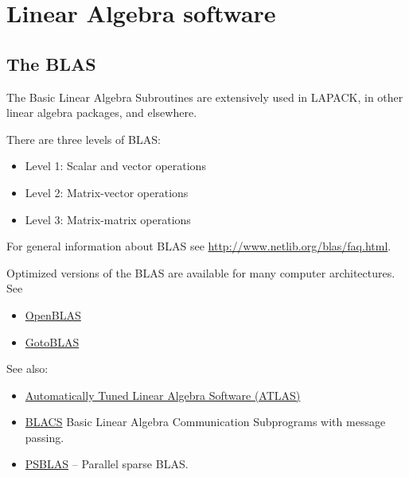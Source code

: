 \documentclass[letterpaper,10pt,english]{sphinxmanual}
\begin{document}
\section{Linear Algebra software}
\label{linalg:linear-algebra-software}\label{linalg::doc}\label{linalg:linalg}

\subsection{The BLAS}
\label{linalg:blas}\label{linalg:the-blas}
The Basic Linear Algebra Subroutines are extensively used in LAPACK, in
other linear algebra packages, and elsewhere.

There are three levels of BLAS:
\begin{itemize}
\item {} 
Level 1: Scalar and vector operations

\item {} 
Level 2: Matrix-vector operations

\item {} 
Level 3: Matrix-matrix operations

\end{itemize}

For general information about BLAS see
\url{http://www.netlib.org/blas/faq.html}.

Optimized versions of the BLAS are available for many computer
architectures.  See
\begin{itemize}
\item {} 
\href{http://xianyi.github.io/OpenBLAS/}{OpenBLAS}

\item {} 
\href{http://www.tacc.utexas.edu/tacc-projects/gotoblas2}{GotoBLAS}

\end{itemize}

See also:
\begin{itemize}
\item {} 
\href{http://math-atlas.sourceforge.net/}{Automatically Tuned Linear Algebra Software (ATLAS)}

\item {} 
\href{http://www.netlib.org/blacs/}{BLACS} Basic Linear Algebra Communication
Subprograms with message passing.

\item {} 
\href{http://www.ce.uniroma2.it/psblas/}{PSBLAS} -- Parallel sparse BLAS.

\end{itemize}
\end{document}
